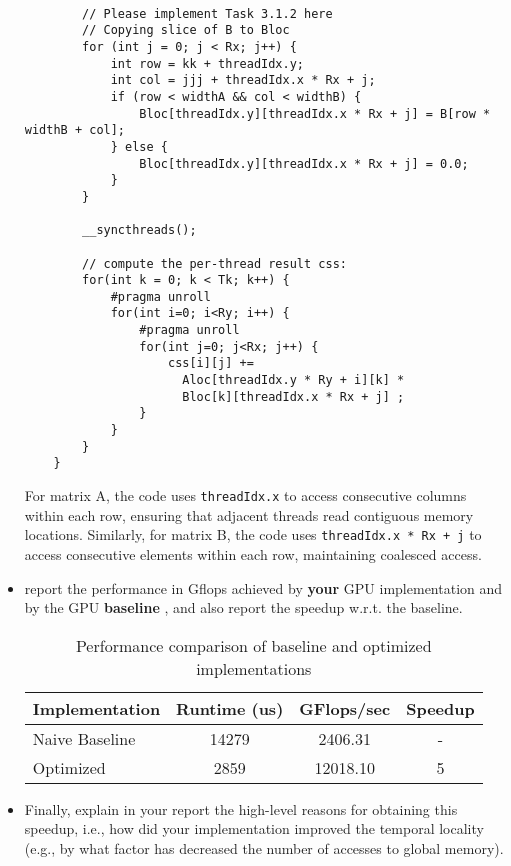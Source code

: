 \documentclass{article}
\begin{document}
\begin{itemize}
\begin{lstlisting}[language=cuda]
  
        // Please implement Task 3.1.2 here
        // Copying slice of B to Bloc
        for (int j = 0; j < Rx; j++) {
            int row = kk + threadIdx.y;
            int col = jjj + threadIdx.x * Rx + j;
            if (row < widthA && col < widthB) {
                Bloc[threadIdx.y][threadIdx.x * Rx + j] = B[row * widthB + col];
            } else {
                Bloc[threadIdx.y][threadIdx.x * Rx + j] = 0.0;
            }
        }
  
        __syncthreads();
  
        // compute the per-thread result css:
        for(int k = 0; k < Tk; k++) {
            #pragma unroll
            for(int i=0; i<Ry; i++) {
                #pragma unroll
                for(int j=0; j<Rx; j++) {
                    css[i][j] +=  
                      Aloc[threadIdx.y * Ry + i][k] *
                      Bloc[k][threadIdx.x * Rx + j] ;
                }
            }
        }
    }
    \end{lstlisting}

    For matrix A, the code uses \texttt{threadIdx.x} to access consecutive columns within each row, ensuring that adjacent threads read contiguous memory locations. 
    Similarly, for matrix B, the code uses \texttt{threadIdx.x * Rx + j} to access consecutive elements within each row, maintaining coalesced access. 
    
    \item report the performance in Gflops achieved by \textbf{your} GPU implementation
    and by the GPU \textbf{baseline} , and also report the speedup w.r.t. the
    baseline.

    
    \begin{table}[h]
        \centering
        \begin{tabular}{|l|c|c|c|}
        \hline
        \textbf{Implementation} & \textbf{Runtime (us)} & \textbf{GFlops/sec} & \textbf{Speedup} \\
        \hline
        Naive Baseline & 14279 & 2406.31 & -\\
        Optimized & 2859 & 12018.10 & 5 \\
        \hline
        \end{tabular}
        \caption{Performance comparison of baseline and optimized implementations}
        \label{tab:performance-comparison}
    \end{table}

    \item Finally, explain in your report the high-level reasons for obtaining
    this speedup, i.e., how did your implementation improved the temporal
    locality (e.g., by what factor has decreased the number of accesses to
    global memory).


\end{itemize}
\end{document}
